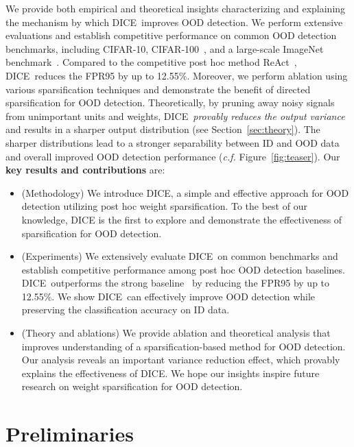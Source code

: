 \documentclass[runningheads]{llncs}
\newcommand{\methodAbbr}{DICE~}
\begin{document}
We provide both empirical and theoretical insights characterizing and explaining the mechanism by which \methodAbbr improves OOD detection. We perform extensive evaluations and establish competitive performance on common OOD detection benchmarks, including CIFAR-10, CIFAR-100~\cite{krizhevsky2009learning}, and a large-scale ImageNet benchmark~\cite{huang2021mos}. Compared to the competitive post hoc method ReAct~\cite{sun2021react}, \methodAbbr reduces the FPR95 by up to {12.55}\%. Moreover, we perform ablation using various sparsification techniques and demonstrate the benefit of {directed sparsification} for OOD detection. 
Theoretically, by pruning away noisy signals from unimportant units and weights,
\methodAbbr  \emph{provably reduces the output variance}  and results in a sharper output distribution (see Section~\ref{sec:theory}). The sharper distributions lead to a stronger separability between ID and OOD data and overall improved OOD detection performance (\emph{c.f.} Figure~\ref{fig:teaser}).  Our \textbf{key results and contributions} are:
\begin{itemize}
    \item (Methodology) We introduce DICE, a simple and effective approach for OOD detection utilizing {post hoc} weight sparsification. To the best of our knowledge, DICE is the first to explore and demonstrate the effectiveness of sparsification for OOD detection.  
    
    \item (Experiments) We extensively evaluate \methodAbbr on common benchmarks and establish competitive performance among post hoc OOD detection baselines. \methodAbbr  outperforms the strong baseline~\cite{sun2021react} by reducing the FPR95 by up to {12.55}\%. We show \methodAbbr can effectively improve OOD detection while preserving the classification accuracy on ID data.
    
    \item (Theory and ablations) We provide  ablation and theoretical analysis that improves understanding of a sparsification-based method for OOD detection. Our analysis reveals an important variance reduction effect, which provably explains the effectiveness of DICE. We hope our insights inspire future research on weight sparsification for OOD detection. 
\end{itemize} 






\section{Preliminaries}
\label{sec:background}
\end{document}
